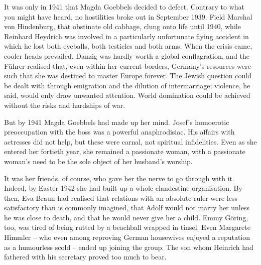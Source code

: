
It was only in 1941 that Magda Goebbels decided to defect. Contrary to what you might have heard, no hostilities broke out in September 1939. Field Marshal von Hindenburg, that obstinate old cabbage, clung onto life until 1940, while Reinhard Heydrich was involved in a particularly unfortunate flying accident in which he lost both eyeballs, both testicles and both arms. When the crisis came, cooler heads prevailed. Danzig was hardly worth a global conflagration, and the F\"uhrer realised that, even within her current borders, Germany's resources were such that she was destined to master Europe forever. The Jewish question could be dealt with through emigration and the dilution of intermarriage; violence, he said, would only draw unwanted attention. World domination could be achieved without the risks and hardships of war.

But by 1941 Magda Goebbels had made up her mind. Josef's homoerotic preoccupation with the boss was a powerful anaphrodisiac. His affairs with actresses did not help, but these were carnal, not spiritual infidelities. Even as she entered her fortieth year, she remained a passionate woman, with a passionate woman's need to be the sole object of her husband's worship.

It was her friends, of course, who gave her the nerve to go through with it. Indeed, by Easter 1942 she had built up a whole clandestine organisation. By then, Eva Braun had realised that relations with an absolute ruler were less satisfactory than is commonly imagined, that Adolf would not marry her unless he was close to death, and that he would never give her a child. Emmy G\"oring, too, was tired of being rutted by a beachball wrapped in tinsel. Even Margarete Himmler -- who even among reproving German housewives enjoyed a reputation as a humourless scold -- ended up joining the group. The son whom Heinrich had fathered with his secretary proved too much to bear.

